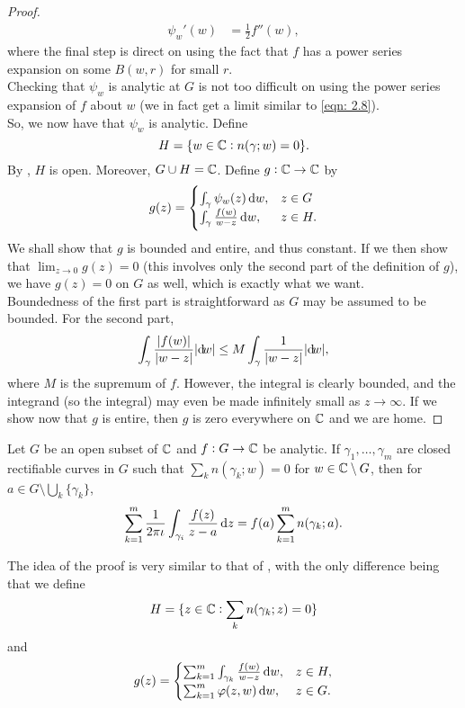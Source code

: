 \begin{proof}
\begin{align}
				\psi_w'(w) &= \frac{1}{2} f''(w), \nonumber
			\end{align}
			where the final step is direct on using the fact that $f$ has a power series expansion on some $B(w,r)$ for small $r$.\\
			Checking that $\psi_w$ is analytic at $G$ is not too difficult on using the power series expansion of $f$ about $w$ (we in fact get a limit similar to \eqref{eqn: 2.8}).\\
			So, we now have that $\psi_w$ is analytic. Define
			\[ H = \{ w \in \mathbb{C} : n(\gamma;w) = 0 \}. \]
			By , $H$ is open. Moreover, $G \cup H = \mathbb{C}$. Define $g:\mathbb{C}\to\mathbb{C}$ by
			\[
				g(z) =
				\begin{cases}
					\int_\gamma \psi_w(z) \dif w, & z \in G \\
					\int_\gamma \frac{f(w)}{w-z} \dif w, & z \in H.
				\end{cases}
			\]
			We shall show that $g$ is bounded and entire, and thus constant. If we then show that $\lim_{z\to 0} g(z) = 0$ (this involves only the second part of the definition of $g$), we have $g(z) = 0$ on $G$ as well, which is exactly what we want.\\
			Boundedness of the first part is straightforward as $G$ may be assumed to be bounded. For the second part,
			\[ \int_\gamma \frac{|f(w)|}{|w-z|} |{\dif}{w}| \le M \int_\gamma \frac{1}{|w-z|} |{\dif}{w}|, \]
			where $M$ is the supremum of $f$. However, the integral is clearly bounded, and the integrand (so the integral) may even be made infinitely small as $z \to \infty$. If we show now that $g$ is entire, then $g$ is zero everywhere on $\mathbb{C}$ and we are home.
		\end{proof}

		\begin{ftheo}
			\label{cauchys integral formula v2}
			Let $G$ be an open subset of $\mathbb{C}$ and $f : G \to \mathbb{C}$ be analytic. If $\gamma_1,\ldots,\gamma_m$ are closed rectifiable curves in $G$ such that $\sum_k n(\gamma_k;w) = 0$ for $w \in \mathbb{C}\setminus G$, then for $a \in G\setminus\bigcup_k\{\gamma_k\}$,
			\[ \sum_{k=1}^m \frac{1}{2\pi\iota} \int_{\gamma_i} \frac{f(z)}{z-a} \dif z = f(a) \sum_{k=1}^m n(\gamma_k;a). \]
		\end{ftheo}
		The idea of the proof is very similar to that of , with the only difference being that we define
		\[ H = \{ z \in \mathbb{C} : \sum_k n(\gamma_k;z) = 0 \} \]
		and
		\[
			g(z) = 
			\begin{cases}
				\sum_{k=1}^m \int_{\gamma_k} \frac{f(w)}{w-z} \dif w, & z \in H, \\
				\sum_{k=1}^m \varphi(z,w) \dif w, & z \in G.
			\end{cases}
		\]

